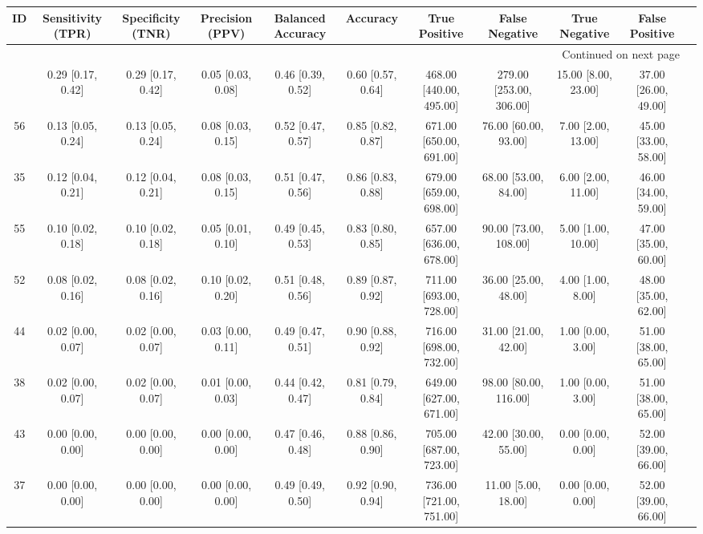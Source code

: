 \documentclass[8pt]{article}
\begin{document}
\begin{center}
\begin{footnotesize}
\begin{longtable}{|ccccccccccc|}
\toprule
 ID &  Sensitivity (TPR) &  Specificity (TNR) &    Precision (PPV) &  Balanced Accuracy &           Accuracy &            True Positive &           False Negative &        True Negative &        False Positive \\
\midrule
\endhead
\midrule
\multicolumn{10}{r}{{Continued on next page}} \\
\midrule
\endfoot

\bottomrule
\endlastfoot
 33 &  0.29 [0.17, 0.42] &  0.29 [0.17, 0.42] &  0.05 [0.03, 0.08] &  0.46 [0.39, 0.52] &  0.60 [0.57, 0.64] &  468.00 [440.00, 495.00] &  279.00 [253.00, 306.00] &  15.00 [8.00, 23.00] &  37.00 [26.00, 49.00] \\
 56 &  0.13 [0.05, 0.24] &  0.13 [0.05, 0.24] &  0.08 [0.03, 0.15] &  0.52 [0.47, 0.57] &  0.85 [0.82, 0.87] &  671.00 [650.00, 691.00] &     76.00 [60.00, 93.00] &   7.00 [2.00, 13.00] &  45.00 [33.00, 58.00] \\
 35 &  0.12 [0.04, 0.21] &  0.12 [0.04, 0.21] &  0.08 [0.03, 0.15] &  0.51 [0.47, 0.56] &  0.86 [0.83, 0.88] &  679.00 [659.00, 698.00] &     68.00 [53.00, 84.00] &   6.00 [2.00, 11.00] &  46.00 [34.00, 59.00] \\
 55 &  0.10 [0.02, 0.18] &  0.10 [0.02, 0.18] &  0.05 [0.01, 0.10] &  0.49 [0.45, 0.53] &  0.83 [0.80, 0.85] &  657.00 [636.00, 678.00] &    90.00 [73.00, 108.00] &   5.00 [1.00, 10.00] &  47.00 [35.00, 60.00] \\
 52 &  0.08 [0.02, 0.16] &  0.08 [0.02, 0.16] &  0.10 [0.02, 0.20] &  0.51 [0.48, 0.56] &  0.89 [0.87, 0.92] &  711.00 [693.00, 728.00] &     36.00 [25.00, 48.00] &    4.00 [1.00, 8.00] &  48.00 [35.00, 62.00] \\
 44 &  0.02 [0.00, 0.07] &  0.02 [0.00, 0.07] &  0.03 [0.00, 0.11] &  0.49 [0.47, 0.51] &  0.90 [0.88, 0.92] &  716.00 [698.00, 732.00] &     31.00 [21.00, 42.00] &    1.00 [0.00, 3.00] &  51.00 [38.00, 65.00] \\
 38 &  0.02 [0.00, 0.07] &  0.02 [0.00, 0.07] &  0.01 [0.00, 0.03] &  0.44 [0.42, 0.47] &  0.81 [0.79, 0.84] &  649.00 [627.00, 671.00] &    98.00 [80.00, 116.00] &    1.00 [0.00, 3.00] &  51.00 [38.00, 65.00] \\
 43 &  0.00 [0.00, 0.00] &  0.00 [0.00, 0.00] &  0.00 [0.00, 0.00] &  0.47 [0.46, 0.48] &  0.88 [0.86, 0.90] &  705.00 [687.00, 723.00] &     42.00 [30.00, 55.00] &    0.00 [0.00, 0.00] &  52.00 [39.00, 66.00] \\
 37 &  0.00 [0.00, 0.00] &  0.00 [0.00, 0.00] &  0.00 [0.00, 0.00] &  0.49 [0.49, 0.50] &  0.92 [0.90, 0.94] &  736.00 [721.00, 751.00] &      11.00 [5.00, 18.00] &    0.00 [0.00, 0.00] &  52.00 [39.00, 66.00] \\
\end{longtable}
\end{footnotesize}
\end{center}
\end{document}
